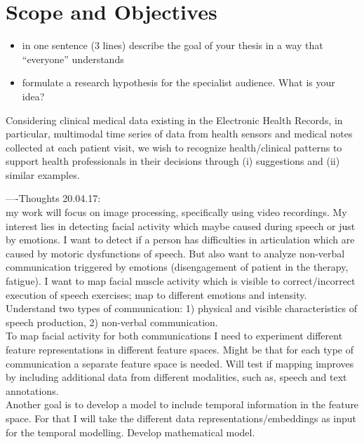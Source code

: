 \section{Scope and Objectives}

\begin{itemize}
    \item in one sentence (3 lines) describe the goal of your thesis in a way that ``everyone'' understands
    \item formulate a research hypothesis for the specialist audience. What is your idea?
\end{itemize}


Considering clinical medical data existing in the Electronic Health Records, in particular, multimodal time series of data from health sensors and medical notes collected at each patient visit, we wish to recognize health/clinical patterns to support health professionals in their decisions through (i) suggestions and (ii) similar examples.

----Thoughts 20.04.17:\\
my work will focus on image processing, specifically using video recordings. My interest lies in detecting facial activity which maybe caused during speech or just  by emotions. I want to detect if a person has difficulties in articulation which are caused by motoric dysfunctions of speech. But also want to analyze non-verbal communication triggered by emotions (disengagement of patient in the therapy, fatigue). I want to map facial muscle activity which is visible to correct/incorrect execution of speech exercises; map to different emotions and intensity. Understand two types of communication: 1) physical and visible characteristics of speech production, 2) non-verbal communication.\\

To map facial activity for both communications I need to experiment different feature representations in different feature spaces. Might be that for each type of communication a separate feature space is needed. Will test if mapping improves by including additional data from different modalities, such as, speech and text annotations. \\

Another goal is to develop a model to include temporal information in the feature space. For that I will take the different data representations/embeddings as input for the temporal modelling. Develop mathematical model.\\

